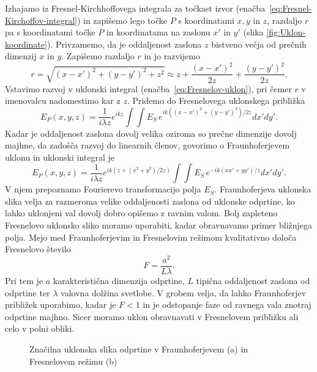 Izhajamo iz Fresnel-Kirchhoffovega integrala za točkast izvor
(enačba~\ref{eq:Fresnel-Kirchoffov-integral}) in zapišemo 
lego točke $P$ s koordinatami $x,y$ in $z$, razdaljo $r$ pa 
s koordinatami točke $P$ in koordinatama na zaslonu $x'$ in $y'$ 
 (slika \ref{fig:Uklon-koordinate}). Privzamemo,
da je oddaljenost zaslona $z$ bistveno večja od prečnih dimenzij $x$ in $y$. 
Zapišemo razdaljo $r$ in jo razvijemo
\begin{equation}
r = \sqrt{(x-x')^2+(y-y')^2 + z^2} \approx z + \frac{(x-x')^2}{2z} +\frac{(y-y')^2}{2z}.
\end{equation}
Vstavimo razvoj v uklonski integral (enačba~\ref{eq:Fresnelov-uklon}), pri 
čemer $r$ v imenovalcu nadomestimo kar z $z$. Pridemo do Fresnelovega uklonskega približka 
\begin{equation}
\label{eq:FresnelApprox}
E_P(x,y,z) =  \frac{1}{i \lambda z } e^{i k z}\int \int E_S\, e^{ik ((x-x')^2+(y-y')^2)/2z} dx' dy'.
\end{equation}
Kadar je oddaljenost zaslona dovolj velika oziroma so prečne dimenzije dovolj majhne, da zadošča 
razvoj do linearnih členov, govorimo o Fraunhoferjevem uklonu in uklonski integral je
\begin{equation}
\label{eq:FraunhoferApprox}
E_P(x,y,z) =  \frac{1}{i\lambda z} e^{i k (z + (x^2+y^2) /2z)}\int \int E_S\,
e^{-ik (xx'+yy')/z} dx' dy'.
\end{equation}
V njem  prepoznamo Fourierevo transformacijo polja $E_S$.
Fraunhoferjeva uklonska slika velja za razmeroma velike oddaljenosti
zaslona od uklonske odprtine, ko lahko uklonjeni val dovolj dobro opišemo z ravnim valom. 
Bolj zapleteno Fresnelovo uklonsko sliko moramo uporabiti, kadar obravnavamo 
primer bližnjega polja. 
Mejo med Fraunhoferjevim in Fresnelovim režimom kvalitativno določa Fresnelovo 
število
\begin{equation}
F= \frac{a^2}{L\lambda}.
\label{eq:Fst}
\end{equation} 
Pri tem je $a$ karakteristična dimenzija odprtine, $L$ tipična oddaljenost zaslona 
od odprtine ter $\lambda$ valovna dolžina svetlobe. V grobem velja, da lahko 
Fraunhoferjev približek uporabimo, kadar je $F<1$ in je odstopanje faze od ravnega vala 
znotraj odprtine majhno. Sicer moramo uklon obravnavati v Fresnelovem približku ali 
celo v polni obliki. 

\begin{figure}[h]
\centering {} 
  
\caption{Značilna uklonska slika odprtine v Fraunhoferjevem (a) in Fresnelovem režimu (b)}
\label{fig:UklonFF}
\end{figure}

